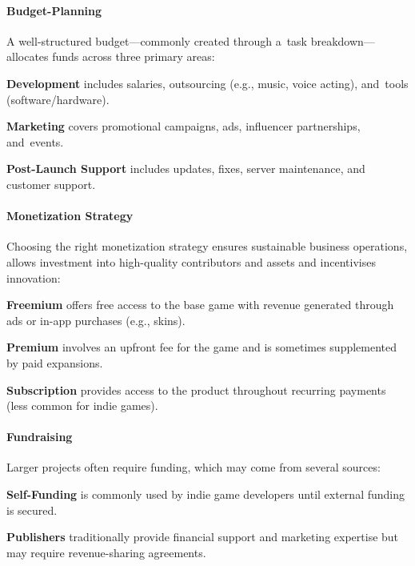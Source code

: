 \paragraph{Budget-Planning} A well-structured budget---commonly created through a~task breakdown\cite{linkedin_budget}---allocates funds across three primary areas:

 \textbf{Development} includes salaries, outsourcing (e.g., music, voice acting), and~tools (software/hardware).\cite{eduonix_costs}

 \textbf{Marketing} covers promotional campaigns, ads, influencer partnerships, and~events.\cite{eduonix_costs}

 \textbf{Post-Launch Support} includes updates, fixes, server maintenance, and customer support.\cite{eduonix_costs}

\paragraph{Monetization Strategy} Choosing the right monetization strategy ensures sustainable business operations, allows investment into high-quality contributors and assets and incentivises innovation:

 \textbf{Freemium} offers free access to the base game with revenue generated through ads or in-app purchases (e.g., skins).\cite{hubka_game-monetization}

 \textbf{Premium} involves an upfront fee for the game and is sometimes supplemented by paid expansions.\cite{hubka_game-monetization}

 \textbf{Subscription} provides access to the product throughout recurring payments (less common for indie games).\cite{hubka_game-monetization}

\paragraph{Fundraising} Larger projects often require funding, which may come from several sources:

 \textbf{Self-Funding} is commonly used by indie game developers until external funding is secured.\cite{perforce-stoftware_tips}

 \textbf{Publishers} traditionally provide financial support and marketing expertise but may require revenue-sharing agreements.\cite{perforce-stoftware_tips}


